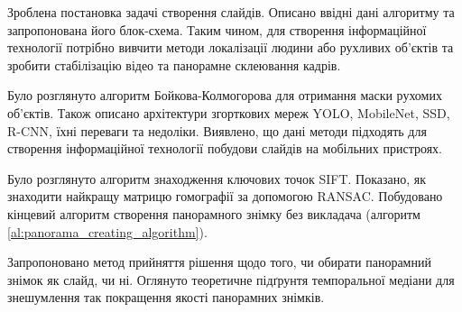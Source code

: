 \chapterConclusion

Зроблена постановка задачі створення слайдів. Описано ввідні
дані алгоритму та запропонована його блок-схема.
Таким чином, для створення інформаційної технології
потрібно вивчити методи локалізації людини або рухливих об'єктів та
зробити стабілізацію відео та панорамне склеювання кадрів.


Було розглянуто алгоритм Бойкова-Колмогорова для
отримання маски рухомих об'єктів. Також описано архітектури
згорткових мереж YOLO, MobileNet, SSD, R-CNN, їхні переваги та недоліки.
Виявлено, що дані методи підходять для
створення інформаційної технології побудови слайдів на
мобільних пристроях.


Було розглянуто алгоритм знаходження ключових точок SIFT.
Показано, як знаходити найкращу матрицю гомографії за
допомогою RANSAC. Побудовано кінцевий алгоритм створення
панорамного знімку без викладача (алгоритм \ref{al:panorama_creating_algorithm}).


Запропоновано метод прийняття рішення щодо того, чи обирати панорамний знімок як слайд, чи ні.
Оглянуто теоретичне підґрунтя темпоральної медіани для
знешумлення так покращення якості панорамних знімків.